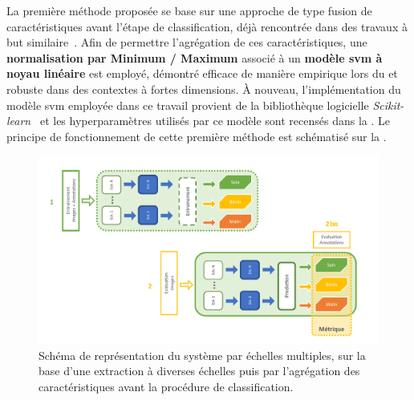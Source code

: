 La première méthode proposée se base sur une approche de type fusion de caractéristiques avant l'étape de classification, déjà rencontrée dans des travaux à but similaire~\cite{Pedersoli2011,Alsaih2016}. Afin de permettre l'agrégation de ces caractéristiques, une \textbf{normalisation par Minimum / Maximum} associé à un \textbf{modèle \gls{svm} à noyau linéaire} est employé, démontré efficace de manière empirique lors du  et robuste dans des contextes à fortes dimensions. À nouveau, l'implémentation du modèle \gls{svm} employée dans ce travail provient de la bibliothèque logicielle \textit{Scikit-learn}~\cite{pedregosa2011} et les hyperparamètres utilisés par ce modèle sont recensés dans la . Le principe de fonctionnement de cette première méthode est schématisé sur la .\par

\begin{figure}[H]
    \centering
    \includegraphics[width=0.9\linewidth]{contents/chapter_6/resources/scheme_image_improvement_multiscale_features.pdf}
    \caption{Schéma de représentation du système par échelles multiples, sur la base d'une extraction à diverses échelles puis par l'agrégation des caractéristiques avant la procédure de classification.}
    \label{fig:scheme_image_improvement_multiscale_features}
\end{figure}\par

